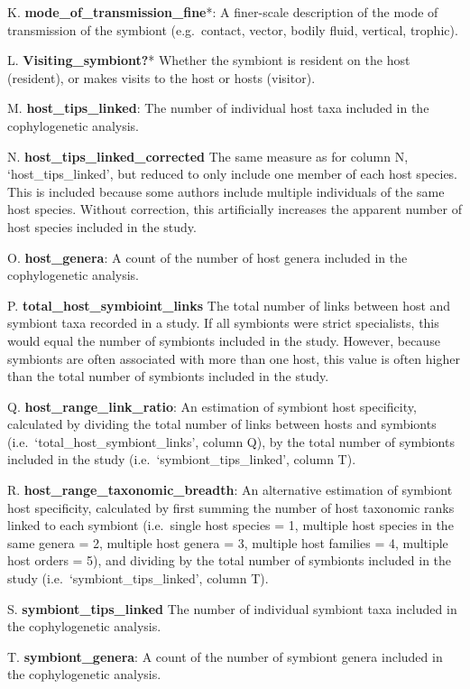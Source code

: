 \documentclass[
]{article}
\begin{document}
K. \textbf{mode\_of\_transmission\_fine}*: A finer-scale description of
the mode of transmission of the symbiont (e.g.~contact, vector, bodily
fluid, vertical, trophic).

L. \textbf{Visiting\_symbiont?}* Whether the symbiont is resident on the
host (resident), or makes visits to the host or hosts (visitor).

M. \textbf{host\_tips\_linked}: The number of individual host taxa
included in the cophylogenetic analysis.

N. \textbf{host\_tips\_linked\_corrected} The same measure as for column
N, `host\_tips\_linked', but reduced to only include one member of each
host species. This is included because some authors include multiple
individuals of the same host species. Without correction, this
artificially increases the apparent number of host species included in
the study.

O. \textbf{host\_genera}: A count of the number of host genera included
in the cophylogenetic analysis.

P. \textbf{total\_host\_symbioint\_links} The total number of links
between host and symbiont taxa recorded in a study. If all symbionts
were strict specialists, this would equal the number of symbionts
included in the study. However, because symbionts are often associated
with more than one host, this value is often higher than the total
number of symbionts included in the study.

Q. \textbf{host\_range\_link\_ratio}: An estimation of symbiont host
specificity, calculated by dividing the total number of links between
hosts and symbionts (i.e.~`total\_host\_symbiont\_links', column Q), by
the total number of symbionts included in the study
(i.e.~`symbiont\_tips\_linked', column T).

R. \textbf{host\_range\_taxonomic\_breadth}: An alternative estimation
of symbiont host specificity, calculated by first summing the number of
host taxonomic ranks linked to each symbiont (i.e.~single host species =
1, multiple host species in the same genera = 2, multiple host genera =
3, multiple host families = 4, multiple host orders = 5), and dividing
by the total number of symbionts included in the study
(i.e.~`symbiont\_tips\_linked', column T).

S. \textbf{symbiont\_tips\_linked} The number of individual symbiont
taxa included in the cophylogenetic analysis.

T. \textbf{symbiont\_genera}: A count of the number of symbiont genera
included in the cophylogenetic analysis.
\end{document}
